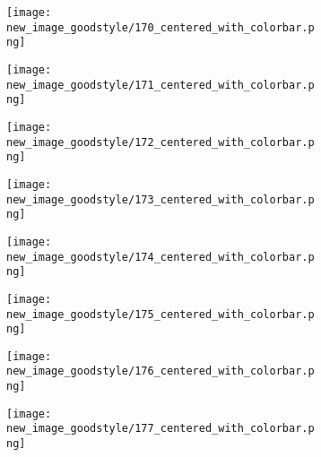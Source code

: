 \documentclass[a4paper,12pt]{article}
\begin{document}
\begin{figure}[H]
  \begin{subfigure}{0.11\textwidth}
    \texttt{[image: new\_image\_goodstyle/170\_centered\_with\_colorbar.png]}
  \end{subfigure}
  \hfill
  \begin{subfigure}{0.11\textwidth}
    \texttt{[image: new\_image\_goodstyle/171\_centered\_with\_colorbar.png]}
  \end{subfigure}
  \hfill
  \begin{subfigure}{0.11\textwidth}
    \texttt{[image: new\_image\_goodstyle/172\_centered\_with\_colorbar.png]}
  \end{subfigure}
  \hfill
  \begin{subfigure}{0.11\textwidth}
    \texttt{[image: new\_image\_goodstyle/173\_centered\_with\_colorbar.png]}
  \end{subfigure}
  \hfill
  \begin{subfigure}{0.11\textwidth}
    \texttt{[image: new\_image\_goodstyle/174\_centered\_with\_colorbar.png]}
  \end{subfigure}
  \hfill
  \begin{subfigure}{0.11\textwidth}
    \texttt{[image: new\_image\_goodstyle/175\_centered\_with\_colorbar.png]}
  \end{subfigure}
  \hfill
  \begin{subfigure}{0.11\textwidth}
    \texttt{[image: new\_image\_goodstyle/176\_centered\_with\_colorbar.png]}
  \end{subfigure}
  \hfill
  \begin{subfigure}{0.11\textwidth}
    \texttt{[image: new\_image\_goodstyle/177\_centered\_with\_colorbar.png]}
  \end{subfigure}
  \hfill
\end{figure}
\end{document}
